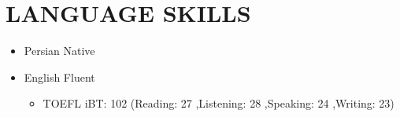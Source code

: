\documentclass[10pt,a4paper,sans]{moderncv} %
\begin{document}
	\section{LANGUAGE SKILLS}
	
	\begin{itemize}
	\item Persian \hspace{5 pt} Native
	\item English \hspace{5 pt} Fluent   
	    \begin{itemize}
			 \item TOEFL iBT: 102 (Reading: 27 ,Listening: 28 ,Speaking: 24 ,Writing: 23)
		\end{itemize}
	\end{itemize} 
	
	
	
\end{document}
